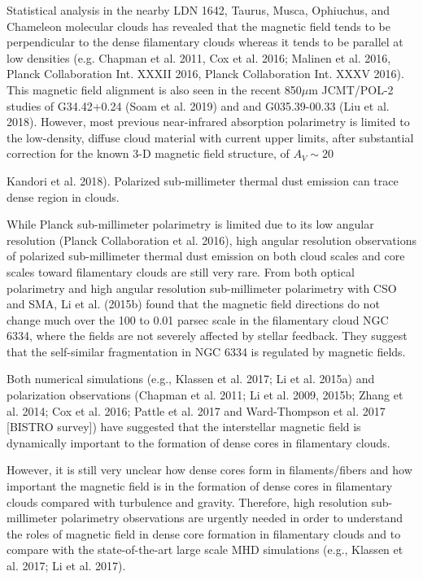 \documentclass[11pt]{amsart}
\begin{document}
Statistical analysis in the nearby LDN 1642,  Taurus, Musca, Ophiuchus, and Chameleon molecular clouds has revealed 
that the magnetic field tends to be perpendicular to the dense filamentary clouds whereas it tends to be parallel 
at low densities (e.g. Chapman et al. 2011, Cox et al. 2016; Malinen et al. 2016, Planck Collaboration Int. XXXII 2016, Planck Collaboration Int. XXXV 2016). 
This magnetic field alignment is also seen in the recent 850$\mu$m JCMT/POL-2 studies of  G34.42+0.24 (Soam et al. 2019) and 
 and G035.39-00.33 (Liu et al. 2018).
However, most previous near-infrared absorption polarimetry is limited to the low-density, diffuse cloud material with current upper limits, after substantial correction for the known 3-D magnetic field structure, of $A_V \sim 20$ {Kandori et al. 2018). Polarized sub-millimeter thermal dust emission can trace dense region in clouds. 

While Planck sub-millimeter polarimetry is limited due to its low angular resolution (Planck Collaboration et al. 2016), high angular resolution observations of polarized sub-millimeter thermal dust emission on both cloud scales and core scales toward filamentary clouds are still very rare. 
From both optical polarimetry and high angular resolution sub-millimeter polarimetry with CSO and SMA, Li et al. (2015b) found that the magnetic field directions do not change much over the 100 to 0.01 parsec scale in the filamentary cloud NGC 6334, where the fields are not severely affected by stellar feedback. 
They suggest that the self-similar fragmentation in NGC 6334 is regulated by magnetic fields.

Both numerical simulations (e.g., Klassen et al. 2017; Li et al. 2015a) and 
polarization observations (Chapman et al. 2011; Li et al. 2009, 2015b; Zhang et al. 2014; Cox et al. 2016; Pattle et al. 2017 and Ward-Thompson et al. 2017 [BISTRO survey]) 
have suggested that the interstellar magnetic field is dynamically important to the formation of dense cores in filamentary clouds. 

However, it is still very unclear how dense cores form in filaments/fibers and how important the magnetic field is in the formation of dense cores in filamentary clouds compared with turbulence and gravity. Therefore, high resolution sub-millimeter polarimetry observations are urgently needed in order to understand the roles of magnetic field in dense core formation in filamentary clouds and to compare with the state-of-the-art large scale MHD simulations (e.g., Klassen et al. 2017; Li et al. 2017).

}
\end{document}
